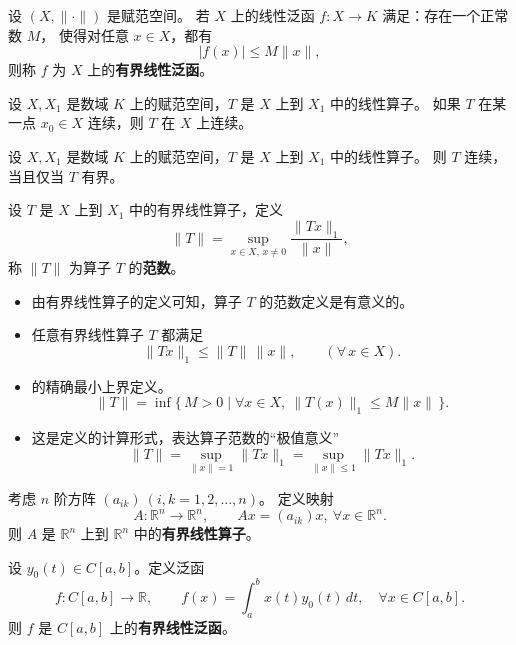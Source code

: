 \begin{definition}[有界线性泛函]
设 $(X,\|\cdot\|)$ 是赋范空间。
若 $X$ 上的线性泛函 $f:X\to K$ 满足：存在一个正常数 $M$，
使得对任意 $x\in X$，都有
\[
|f(x)| \le M\|x\|,
\]
则称 $f$ 为 $X$ 上的\textbf{有界线性泛函}。
\end{definition}
\begin{theorem}[线性算子的前提下一点连续整个联系]
设 $X, X_1$ 是数域 $K$ 上的赋范空间，$T$ 是 $X$ 上到 $X_1$ 中的线性算子。  
如果 $T$ 在某一点 $x_0 \in X$ 连续，则 $T$ 在 $X$ 上连续。
\end{theorem}

\begin{theorem}[连续的必要条件是T是有界线性算子]
设 $X, X_1$ 是数域 $K$ 上的赋范空间，$T$ 是 $X$ 上到 $X_1$ 中的线性算子。  
则 $T$ 连续，当且仅当 $T$ 有界。
\end{theorem}
\begin{definition}
设 $T$ 是 $X$ 上到 $X_1$ 中的有界线性算子，定义
\[
\|T\|=\sup_{x\in X,\,x\ne 0}\frac{\|Tx\|_1}{\|x\|},
\]
称 $\|T\|$ 为算子 $T$ 的\textbf{范数}。


\end{definition}
\begin{itemize}
  \item 由有界线性算子的定义可知，算子 $T$ 的范数定义是有意义的。
  
  \item 任意有界线性算子 $T$ 都满足
  \[
  \|Tx\|_1 \le \|T\|\,\|x\|, \qquad (\forall\,x\in X).
  \]
  
  \item 的精确最小上界定义。
  \[
  \|T\|=\inf\{\,M>0 \mid \forall x\in X,\ \|T(x)\|_1\le M\|x\|\,\}.
  \]
  
  \item 这是定义的计算形式，表达算子范数的“极值意义”
  \[
  \|T\|=\sup_{\|x\|=1}\|Tx\|_1
  =\sup_{\|x\|\le1}\|Tx\|_1.
  \]
\end{itemize}
\begin{example}[例 3.1.1]
考虑 $n$ 阶方阵 $(a_{ik})\ (i,k=1,2,\dots,n)$。  
定义映射
\[
A:\mathbb{R}^n \to \mathbb{R}^n,\qquad A x = (a_{ik})x,\ \forall x\in\mathbb{R}^n.
\]
则 $A$ 是 $\mathbb{R}^n$ 上到 $\mathbb{R}^n$ 中的\textbf{有界线性算子}。
\end{example}

\begin{example}[例 3.1.2]
设 $y_0(t)\in C[a,b]$。定义泛函
\[
f:C[a,b]\to \mathbb{R},\qquad
f(x)=\int_a^b x(t)y_0(t)\,dt,\quad \forall x\in C[a,b].
\]
则 $f$ 是 $C[a,b]$ 上的\textbf{有界线性泛函}。
\end{example}


